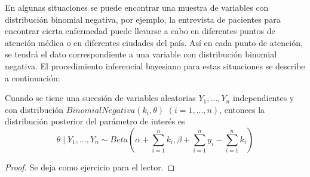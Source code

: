 \documentclass[10pt,openright]{book}\usepackage[]{graphicx}\usepackage[]{color}
\begin{document}
    En algunas situaciones se puede encontrar una muestra de variables con distribuci\'on binomial negativa, por ejemplo, la entrevista de pacientes para encontrar cierta enfermedad puede llevarse a cabo en diferentes puntos de atenci\'on m\'edica o en diferentes ciudades del pa\'is. As\'i en cada punto de atenci\'on, se tendr\'a el dato correspondiente a una variable con distribuci\'on binomial negativa. El procedimiento inferencial bayesiano para estas situaciones se describe a continuaci\'on:
    
    \begin{Res}
    Cuando se tiene una sucesi\'on de variables aleatorias $Y_1,\ldots, Y_n$ independientes y con distribuci\'on $BinomialNegativa(k_i,\theta)$ $(i=1,\ldots,n)$, entonces la distribuci\'on posterior del par\'ametro de inter\'es es
    \begin{equation}
    \theta \mid Y_1,\ldots, Y_n \sim Beta(\alpha+\sum_{i=1}^n k_i,\beta+\sum_{i=1}^n y_i-\sum_{i=1}^n k_i)
    \end{equation}
    \end{Res}
    
    \begin{proof}
    Se deja como ejercicio para el lector.
    \end{proof}
    
\end{document}
